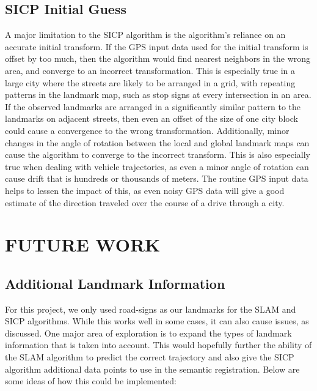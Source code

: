 \documentclass[letterpaper, 10 pt, conference]{ieeeconf}  %
\begin{document}
\subsection{SICP Initial Guess}

A major limitation to the SICP algorithm is the algorithm's reliance on an accurate initial transform. If the GPS input data used for the initial transform is offset by too much, then the algorithm would find nearest neighbors in the wrong area, and converge to an incorrect transformation. This is especially true in a large city where the streets are likely to be arranged in a grid, with repeating patterns in the landmark map, such as stop signs at every intersection in an area. If the observed landmarks are arranged in a significantly similar pattern to the landmarks on adjacent streets, then even an offset of the size of one city block could cause a convergence to the wrong transformation. Additionally, minor changes in the angle of rotation between the local and global landmark maps can cause the algorithm to converge to the incorrect transform. This is also especially true when dealing with vehicle trajectories, as even a minor angle of rotation can cause drift that is hundreds or thousands of meters. The routine GPS input data helps to lessen the impact of this, as even noisy GPS data will give a good estimate of the direction traveled over the course of a drive through a city. 


\addtolength{\textheight}{-5cm}   %

\section{FUTURE WORK}

\subsection{Additional Landmark Information}
For this project, we only used road-signs as our landmarks for the SLAM and SICP algorithms. While this works well in some cases, it can also cause issues, as discussed. One major area of exploration is to expand the types of landmark information that is taken into account. This would hopefully further the ability of the SLAM algorithm to predict the correct trajectory and also give the SICP algorithm additional data points to use in the semantic registration. Below are some ideas of how this could be implemented:
\end{document}
